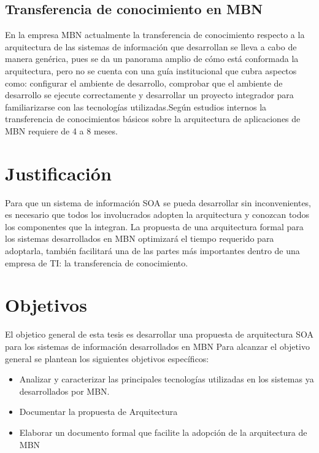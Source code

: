 \subsection{ Transferencia de conocimiento en MBN }
En la empresa MBN actualmente la transferencia de conocimiento respecto a la arquitectura de las sistemas de información que desarrollan se lleva a cabo de manera genérica, pues se da un panorama amplio de cómo está conformada la arquitectura, pero no se cuenta con una guía institucional que cubra aspectos como: configurar el ambiente de desarrollo, comprobar que el ambiente de desarrollo se ejecute correctamente y desarrollar un proyecto integrador para familiarizarse con las tecnologías utilizadas.Según estudios internos la transferencia de conocimientos básicos sobre la arquitectura de aplicaciones de MBN requiere de 4 a 8 meses.

\section{ Justificación }
Para que un sistema de información SOA se pueda desarrollar sin inconvenientes, es necesario que todos los involucrados adopten la arquitectura y conozcan todos los componentes que la integran.
La propuesta de una arquitectura formal para los sistemas desarrollados en MBN optimizará el tiempo requerido para adoptarla, también facilitará una de las partes más importantes dentro de una empresa de  TI: la transferencia de conocimiento. 

\section{ Objetivos }
El objetico general de esta tesis es desarrollar una propuesta de arquitectura SOA para los sistemas de información desarrollados en MBN
Para alcanzar el objetivo general se plantean los siguientes objetivos específicos:
\begin{itemize}
\item Analizar y caracterizar las principales tecnologías utilizadas en los sistemas ya desarrollados por MBN.
\item Documentar la propuesta de Arquitectura 
\item Elaborar un documento formal que facilite la adopción de la arquitectura de MBN
\end{itemize}